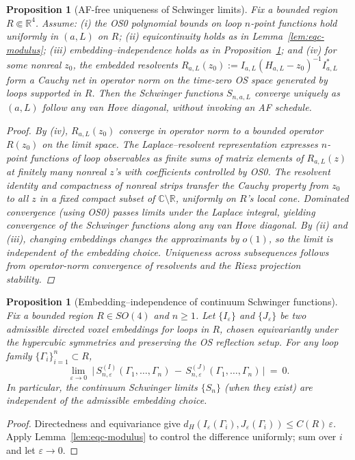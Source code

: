 \documentclass[11pt]{amsart}
\theoremstyle{plain}
\newtheorem{proposition}[theorem]{Proposition}
\theoremstyle{definition}
\theoremstyle{remark}
\begin{document}
\begin{proposition}[AF-free uniqueness of Schwinger limits]\label{prop:af-free-uniqueness}
Fix a bounded region $R\Subset\mathbb R^4$. Assume: (i) the OS0 polynomial bounds on loop $n$-point functions hold uniformly in $(a,L)$ on $R$; (ii) equicontinuity holds as in Lemma~\ref{lem:eqc-modulus}; (iii) embedding–independence holds as in Proposition~\ref{prop:embedding-independence}; and (iv) for some nonreal $z_0$, the embedded resolvents $R_{a,L}(z_0):=I_{a,L}(H_{a,L}-z_0)^{-1}I_{a,L}^*$ form a Cauchy net in operator norm on the time-zero OS space generated by loops supported in $R$. Then the Schwinger functions $S_{n,a,L}$ converge uniquely as $(a,L)$ follow any van Hove diagonal, without invoking an AF schedule.
\begin{proof}
By (iv), $R_{a,L}(z_0)$ converge in operator norm to a bounded operator $R(z_0)$ on the limit space. The Laplace–resolvent representation expresses $n$-point functions of loop observables as finite sums of matrix elements of $R_{a,L}(z)$ at finitely many nonreal $z$'s with coefficients controlled by OS0. The resolvent identity and compactness of nonreal strips transfer the Cauchy property from $z_0$ to all $z$ in a fixed compact subset of $\mathbb C\setminus\mathbb R$, uniformly on $R$'s local cone. Dominated convergence (using OS0) passes limits under the Laplace integral, yielding convergence of the Schwinger functions along any van Hove diagonal. By (ii) and (iii), changing embeddings changes the approximants by $o(1)$, so the limit is independent of the embedding choice. Uniqueness across subsequences follows from operator-norm convergence of resolvents and the Riesz projection stability.
\end{proof}
\end{proposition}

\begin{proposition}[Embedding–independence of continuum Schwinger functions]\label{prop:embedding-independence}
Fix a bounded region $R\in SO(4)$ and $n\ge 1$. Let $\{I_\varepsilon\}$ and $\{J_\varepsilon\}$ be two admissible directed voxel embeddings for loops in $R$, chosen equivariantly under the hypercubic symmetries and preserving the OS reflection setup. For any loop family $\{\Gamma_i\}_{i=1}^n\subset R$,
\[
  \lim_{\varepsilon\to 0}\ \Big|\, S_{n,\varepsilon}^{(I)}(\Gamma_1,\dots,\Gamma_n)\,-\,S_{n,\varepsilon}^{(J)}(\Gamma_1,\dots,\Gamma_n)\,\Big|\ =\ 0.
\]
In particular, the continuum Schwinger limits $\{S_n\}$ (when they exist) are independent of the admissible embedding choice.
\end{proposition}
\begin{proof}
Directedness and equivariance give $d_H(I_\varepsilon(\Gamma_i),J_\varepsilon(\Gamma_i))\le C(R)\,\varepsilon$. Apply Lemma~\ref{lem:eqc-modulus} to control the difference uniformly; sum over $i$ and let $\varepsilon\to 0$.
\end{proof}
\end{document}

